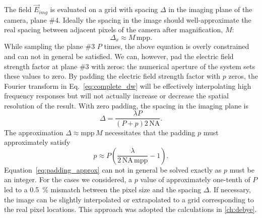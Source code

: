   The field $\vec{E}_{img}$ is evaluated on a grid with spacing $\Delta$
  in the imaging plane of the camera, plane \#4. Ideally the spacing in the image
  should well-approximate the real spacing between adjacent 
  pixels of the camera after magnification, $M$:
  \begin{equation}
  \Delta_x \approx M\, \text{mpp}.
  \end{equation}        
  While sampling the plane \#3 $P$ times, the above equation is overly constrained and
  can not in general be satisfied. We can, however, pad the electric field strength factor
  at plane \#3 with zeros: the numerical aperture of the system sets these values to
  zero. By padding the electric field strength factor with $p$ zeros,
  the Fourier transform in Eq.~\eqref{eq:complete_dw} will be effectively
  interpolating high frequency responses but will not actually increase or decrease
  the spatial resolution of the result. With zero padding, the spacing in the imaging
  plane is
  \begin{equation}
  \Delta = \frac{\lambda P}{\left ( P + p \right ) 2\, \text{NA}}.
  \end{equation} 
  The approximation $\Delta \approx \text{mpp} \, M$  necessitates that the
  padding $p$ must approximately satisfy
  \begin{equation}
    p \approx P \left ( \frac{\lambda}{2 \, \text{NA} \, \text{mpp}} - 1 \right ).
    \label{eq:padding_approx}
  \end{equation}
  Equation~\eqref{eq:padding_approx} can not in general be solved exactly as $p$
  must be an integer. For the cases we considered, a $p$ value of approximately
  one-tenth of $P$ led to a \SI{0.5}{\percent} mismatch between the pixel size
  and the spacing $\Delta$. If necessary, the image can be slightly interpolated
  or extrapolated to a grid corresponding to the real pixel locations. This
  approach was adopted the calculations in \autoref{ch:debye}.
  
